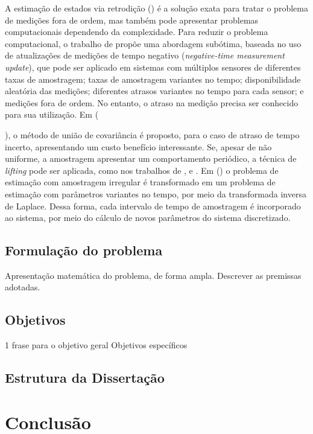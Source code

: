 A estimação de estados via retrodição () é a solução exata para tratar o problema de medições fora de ordem, mas também pode apresentar problemas computacionais dependendo da complexidade. Para reduzir o problema computacional, o trabalho de  propõe uma abordagem subótima, baseada no uso de atualizações de medições de tempo negativo (\textit{negative-time measurement update}), que pode ser aplicado em sistemas com múltiplos sensores de diferentes taxas de amostragem; taxas de amostragem variantes no tempo; disponibilidade aleatória das medições; diferentes atrasos variantes no tempo para cada sensor; e medições fora de ordem. No entanto, o atraso na medição precisa ser conhecido para sua utilização.
%
Em ({), o método de união de covariância é proposto, para o caso de atraso de tempo incerto, apresentando um custo benefício interessante. Se, apesar de não uniforme, a amostragem apresentar um comportamento periódico, a técnica de \textit{lifting} pode ser aplicada, como nos trabalhos de ,  e . Em () o problema de estimação com amostragem irregular é transformado em um problema de estimação com parâmetros variantes no tempo, por meio da transformada inversa de Laplace. Dessa forma, cada intervalo de tempo de amostragem é incorporado ao sistema, por meio do cálculo de novos parâmetros do sistema discretizado.

% 
\section{Formulação do problema}

Apresentação matemática do problema, de forma ampla. Descrever as premissas adotadas.

\section{Objetivos}

1 frase para o objetivo geral
Objetivos específicos

\section{Estrutura da Dissertação}


\chapter{Conclusão}

}
